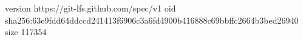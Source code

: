 version https://git-lfs.github.com/spec/v1
oid sha256:63e9fdd64ddccd241413f6906c3a6fd4900b416888c69bbffc2664b3bed26940
size 117354
